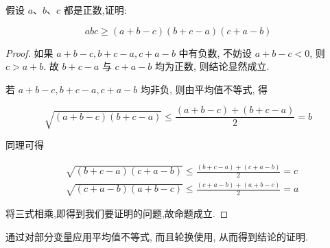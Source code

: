 \begin{example}
	假设 $a 、 b 、 c$ 都是正数,证明:
	
	$$
	a b c \geqslant(a+b-c)(b+c-a)(c+a-b)
	$$
\end{example}
\begin{proof}
	如果 $a+b-c, b+c-a, c+a-b$ 中有负数, 不妨设 $a+b-c<0$, 则 $c>a+b$. 故 $b+c-a$ 与 $c+a-b$ 均为正数, 则结论显然成立.
	
	若 $a+b-c, b+c-a, c+a-b$ 均非负, 则由平均值不等式, 得
	
	$$
	\sqrt{(a+b-c)(b+c-a)} \leqslant \frac{(a+b-c)+(b+c-a)}{2}=b
	$$
	
	同理可得
	
	$$
	\begin{aligned}
	& \sqrt{(b+c-a)(c+a-b)} \leqslant \frac{(b+c-a)+(c+a-b)}{2}=c \\
	& \sqrt{(c+a-b)(a+b-c)} \leqslant \frac{(c+a-b)+(a+b-c)}{2}=a
	\end{aligned}
	$$
	
	将三式相乘,即得到我们要证明的问题,故命题成立.
\end{proof}
\begin{note}
	通过对部分变量应用平均值不等式, 而且轮换使用, 从而得到结论的证明.
\end{note}

